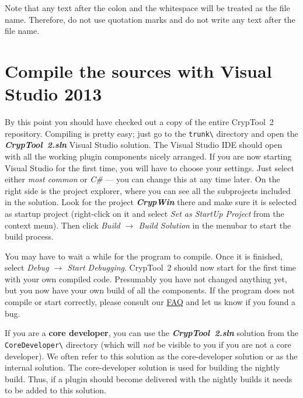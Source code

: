 \begin{center}
\end{center}

Note that any text after the colon and the whitespace will be treated as the file name. Therefore, do not use quotation marks and do not write any text after the file name.

\section{Compile the sources with Visual Studio 2013}
\label{CompilingTheSourcesVS}

By this point you should have checked out a copy of the entire CrypTool~2 repository. Compiling is pretty easy; just go to the \texttt{trunk\textbackslash} directory and open the \textbf{\textit{CrypTool~2.sln}} Visual Studio solution. The Visual Studio IDE should open with all the working plugin components nicely arranged. If you are now starting Visual Studio for the first time, you will have to choose your settings. Just select either \textit{most common} or \textit{C\#} --- you can change this at any time later. On the right side is the project explorer, where you can see all the subprojects included in the solution. Look for the project \textbf{\textit{CrypWin}} there and make sure it is selected as startup project (right-click on it and select \textit{Set as StartUp Project} from the context menu). Then click \textit{Build $\rightarrow$ Build Solution} in the menubar to start the build process.

You may have to wait a while for the program to compile. Once it is finished, select \textit{Debug $\rightarrow$ Start Debugging}. CrypTool~2 should now start for the first time with your own compiled code. Presumably you have not changed anything yet, but you now have your own build of all the components. If the program does not compile or start correctly, please consult our \href{https://trac.ct2.cryptool.org/wiki/FAQ}{FAQ} and let us know if you found a bug.

If you are a \textbf{core developer}, you can use the \textbf{\textit{CrypTool~2.sln}} solution from the \texttt{CoreDeveloper\textbackslash} directory (which will \textit{not} be visible to you if you are not a core developer). We often refer to this solution as the core-developer solution or as the internal solution. The core-developer solution is used for building the nightly build. Thus, if a plugin should become delivered with the nightly builds it needs to be added to this solution.

